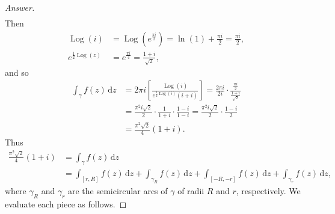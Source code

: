 \documentclass[12pt]{article}
\newcommand\paren[1]{\left( #1 \right)}
\newcommand{\sqbrack}[1]{\left [ #1 \right ]}
\renewcommand{\i}[4]{\int_{#1}^{#2} {#3} \, \mathrm{d} {#4} }
\theoremstyle{definition}
\DeclareMathOperator\Log{Log}
\begin{document}
\begin{proof}[Answer]
\begin{align*}
    \end{align*}
    Then 
    \begin{align*}
        \Log(i) & = \Log \paren{ e^{\frac{\pi i}{2}} } = \ln(1) + \frac{\pi i}{2} = \frac{\pi i}{2} , \\ 
        e^{\frac{1}{2}\Log(z)} & = e^{\frac{\pi i}{4}} = \frac{1 + i}{\sqrt{2}} ,
    \end{align*}
    and so 
    \begin{align*}
        \i{\gamma}{}{f(z)}{z} & = 2\pi i  \sqbrack{ \frac{ \Log(i)}{e^{\frac{1}{2}\Log(i)}(i + i)} } = \frac{2\pi i}{2i} \cdot \frac{ \frac{\pi i}{2} }{ \frac{1 + i}{\sqrt{2}} } \\ 
        & = \frac{\pi^2 i\sqrt{2}}{2} \cdot \frac{1}{1 + i} \cdot \frac{1 - i}{1 - i} = \frac{\pi^2 i\sqrt{2}}{2} \cdot \frac{1 - i}{2} \\ 
        & = \frac{\pi^2 \sqrt{2}}{4} (1 + i) . 
    \end{align*}
    Thus 
    \begin{align*}
        \frac{\pi^2 \sqrt{2}}{4} (1 + i) & = \i{\gamma}{}{f(z)}{z} \\ 
        & = \i{[r,R]}{}{f(z)}{z} + \i{\gamma_R}{}{f(z)}{z} + \i{[-R,-r]}{}{f(z)}{z} + \i{\gamma_r}{}{f(z)}{z} , 
    \end{align*}
    where $\gamma_R$ and $\gamma_r$ are the semicircular arcs of $\gamma$ of radii $R$ and $r$, respectively. We evaluate each piece as follows. 
    

\end{proof}
\end{document}
